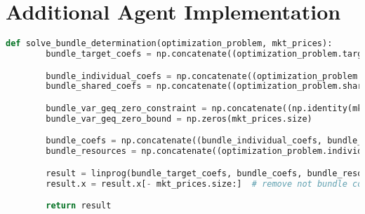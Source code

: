 \section{Additional Agent Implementation}
\label{appendix:additional_agent}

\begin{lstlisting}[float=htbp, label=lst:solving_bundle_determination, caption=Solving of Bundle Determination, language=Python]
    def solve_bundle_determination(optimization_problem, mkt_prices):
        bundle_target_coefs = np.concatenate((optimization_problem.target_coefs, mkt_prices))

        bundle_individual_coefs = np.concatenate((optimization_problem.individual_coefs, np.zeros(optimization_problem.individual_coefs.shape)), axis=1)
        bundle_shared_coefs = np.concatenate((optimization_problem.shared_coefs, np.identity(mkt_prices.size, dtype=float) * (-1)), axis=1)

        bundle_var_geq_zero_constraint = np.concatenate((np.identity(mkt_prices.size) * (-1), np.zeros(optimization_problem.shared_coefs.shape)), axis=1)
        bundle_var_geq_zero_bound = np.zeros(mkt_prices.size)

        bundle_coefs = np.concatenate((bundle_individual_coefs, bundle_shared_coefs, bundle_var_geq_zero_constraint))
        bundle_resources = np.concatenate((optimization_problem.individual_resources, optimization_problem.shared_resources, bundle_var_geq_zero_bound))

        result = linprog(bundle_target_coefs, bundle_coefs, bundle_resources)
        result.x = result.x[- mkt_prices.size:]  # remove not bundle coefficients

        return result
\end{lstlisting}

\clearpage
